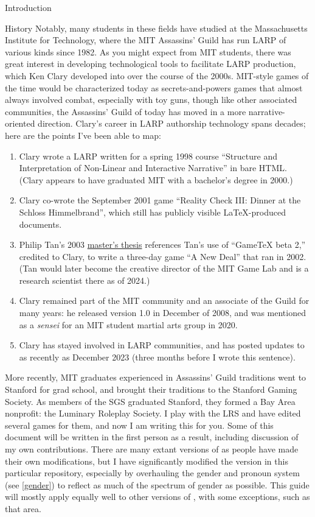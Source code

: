 \documentclass[sheet]{GameTexBase}
\begin{document}
\begin{section}{Introduction}
\begin{subsection}{History}
Notably, many students in these fields have studied at the Massachusetts Institute for Technology, where the MIT Assassins' Guild has run LARP of various kinds since 1982.
As you might expect from MIT students, there was great interest in developing technological tools to facilitate LARP production, which Ken Clary developed into \gametex{} over the course of the 2000s.
MIT-style games of the time would be characterized today as secrets-and-powers games that almost always involved combat, especially with toy guns, though like other associated communities, the Assassins' Guild of today
has moved in a more narrative-oriented direction.
Clary's career in LARP authorship technology spans decades; here are the points I've been able to map:
\begin{enumerate}
\item Clary wrote a LARP written for a spring 1998 course ``Structure and Interpretation of Non-Linear and Interactive Narrative'' in bare HTML.  (Clary appears to have graduated MIT with a bachelor's degree in 2000.)
\item Clary co-wrote the September 2001 game  ``Reality Check III: Dinner at the Schloss Himmelbrand'', which still has publicly visible \LaTeX{}-produced documents.
\item Philip Tan's 2003 \href{https://drive.google.com/file/d/1RiGc2OWtXIPlebHVrixv2IpAbSGAThtd/view?usp=sharing}{master's thesis} references Tan's use of ``GameTeX beta 2,'' credited to Clary, to write a three-day game ``A New Deal'' that ran in 2002.  (Tan would later become the creative director of the MIT Game Lab and is a research scientist there as of 2024.)
\item Clary remained part of the MIT community and an associate of the Guild for many years: he released \gametex{} version 1.0 in December of 2008, and was mentioned as a \emph{sensei} for an MIT student martial arts group in 2020.
\item Clary has stayed involved in LARP communities, and has posted updates to \gametex{} as recently as December 2023 (three months before I wrote this sentence).
\end{enumerate}
More recently, MIT graduates experienced in Assassins' Guild traditions went to Stanford for grad school, and brought their traditions to the Stanford Gaming Society.  As members of the SGS graduated Stanford, 
they formed a Bay Area nonprofit: the Luminary Roleplay Society.  I play with the LRS and have edited several games for them, and now I am writing this for you.  Some of this document will be written in the first person as a result, including discussion of my own contributions.  There are many extant versions of \gametex{} as people have made their own modifications, but I have significantly modified the version in this particular repository, especially by overhauling the gender and pronoun system (see \ref{gender}) to reflect as much of the spectrum of gender as possible.  This guide will mostly apply equally well to other versions of \gametex{}, with some exceptions, such as that area.

\end{subsection}
\end{section}
\end{document}
